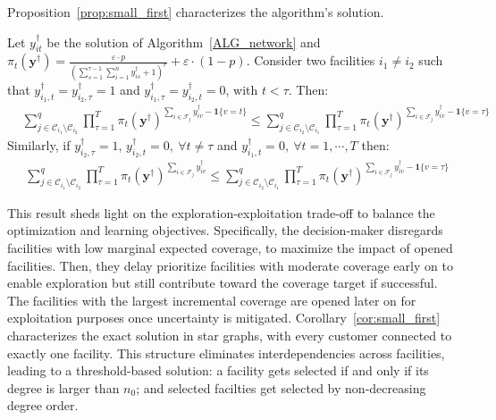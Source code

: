 \documentclass[nonblindrev]{informs3noheader}
\def\calC{\mathcal{C}}
\def\calF{\mathcal{F}}
\def\by{\boldsymbol{y}}
\begin{document}
Proposition~\ref{prop:small_first} characterizes the algorithm's solution.

\begin{proposition}\label{prop:small_first}
    Let $y^\dagger_{it}$ be the solution of Algorithm~\ref{ALG_network} and $\pi_t(\by^\dagger)=\frac{\varepsilon\cdot p}{\left(\sum_{s=1}^{\tau-1} \sum_{i=1}^n y^\dagger_{is} +1\right)^r}+\varepsilon\cdot(1-p)$. Consider two facilities $i_1\neq i_2$ such that $y^\dagger_{i_1,t}=y^\dagger_{i_2, \tau}=1$ and $y^\dagger_{i_1,\tau}=y^\dagger_{i_2, t}=0$, with $t<\tau$. Then:
    \begin{align*}
        &\sum_{j \in \calC_{i_1} \setminus \calC_{i_2}}^q \prod_{\tau=1}^T \pi_t(\by^\dagger)^{\sum_{i \in \calF_j} y^\dagger_{iv}-\mathbf{1}\{v=t\}}
    \leq \sum_{j \in \calC_{i_2} \setminus \calC_{i_1}}^q \prod_{\tau=1}^T \pi_t(\by^\dagger)^{\sum_{i \in \calF_j} y^\dagger_{iv}-\mathbf{1}\{v=\tau\}}
    \end{align*}
    Similarly, if $y^\dagger_{i_2,\tau}=1$, $y^\dagger_{i_2,t}=0,\ \forall t\neq\tau$ and $y^\dagger_{i_1,t}=0,\ \forall t=1,\cdots,T$ then:
    \begin{align*}
        &\sum_{j \in \calC_{i_1} \setminus \calC_{i_2}}^q \prod_{\tau=1}^T \pi_t(\by^\dagger)^{\sum_{i \in \calF_j} y^\dagger_{iv}}
    \leq \sum_{j \in \calC_{i_2} \setminus \calC_{i_1}}^q \prod_{\tau=1}^T \pi_t(\by^\dagger)^{\sum_{i \in \calF_j} y^\dagger_{iv}-\mathbf{1}\{v=\tau\}}
    \end{align*}
\end{proposition}

This result sheds light on the exploration-exploitation trade-off to balance the optimization and learning objectives. Specifically, the decision-maker disregards facilities with low marginal expected coverage, to maximize the impact of opened facilities. Then, they delay prioritize facilities with moderate coverage early on to enable exploration but still contribute toward the coverage target if successful. The facilities with the largest incremental coverage are opened later on for exploitation purposes once uncertainty is mitigated. Corollary~\ref{cor:small_first} characterizes the exact solution in star graphs, with every customer connected to exactly one facility. This structure eliminates interdependencies across facilities, leading to a threshold-based solution: a facility gets selected if and only if its degree is larger than $n_0$; and selected facilties get selected by non-decreasing degree order.
\end{document}
